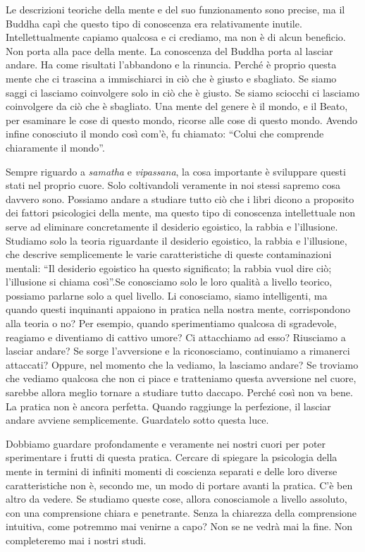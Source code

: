 Le descrizioni teoriche della mente e del suo funzionamento sono
precise, ma il Buddha capì che questo tipo di conoscenza era
relativamente inutile. Intellettualmente capiamo qualcosa e ci crediamo,
ma non è di alcun beneficio. Non porta alla pace della mente. La
conoscenza del Buddha porta al lasciar andare. Ha come risultati
l'abbandono e la rinuncia. Perché è proprio questa mente che ci trascina
a immischiarci in ciò che è giusto e sbagliato. Se siamo saggi ci
lasciamo coinvolgere solo in ciò che è giusto. Se siamo sciocchi ci
lasciamo coinvolgere da ciò che è sbagliato. Una mente del genere è il
mondo, e il Beato, per esaminare le cose di questo mondo, ricorse alle
cose di questo mondo. Avendo infine conosciuto il mondo così com'è, fu
chiamato: ``Colui che comprende chiaramente il mondo''.

Sempre riguardo a \emph{samatha} e \emph{vipassana}, la cosa importante
è sviluppare questi stati nel proprio cuore. Solo coltivandoli veramente
in noi stessi sapremo cosa davvero sono. Possiamo andare a studiare
tutto ciò che i libri dicono a proposito dei fattori psicologici della
mente, ma questo tipo di conoscenza intellettuale non serve ad eliminare
concretamente il desiderio egoistico, la rabbia e l'illusione. Studiamo
solo la teoria riguardante il desiderio egoistico, la rabbia e
l'illusione, che descrive semplicemente le varie caratteristiche di
queste contaminazioni mentali: ``Il desiderio egoistico ha questo
significato; la rabbia vuol dire ciò; l'illusione si chiama così''.Se
conosciamo solo le loro qualità a livello teorico, possiamo parlarne
solo a quel livello. Li conosciamo, siamo intelligenti, ma quando questi
inquinanti appaiono in pratica nella nostra mente, corrispondono alla
teoria o no? Per esempio, quando sperimentiamo qualcosa di sgradevole,
reagiamo e diventiamo di cattivo umore? Ci attacchiamo ad esso?
Riusciamo a lasciar andare? Se sorge l'avversione e la riconosciamo,
continuiamo a rimanerci attaccati? Oppure, nel momento che la vediamo,
la lasciamo andare? Se troviamo che vediamo qualcosa che non ci piace e
tratteniamo questa avversione nel cuore, sarebbe allora meglio tornare a
studiare tutto daccapo. Perché così non va bene. La pratica non è ancora
perfetta. Quando raggiunge la perfezione, il lasciar andare avviene
semplicemente. Guardatelo sotto questa luce.

Dobbiamo guardare profondamente e veramente nei nostri cuori per poter
sperimentare i frutti di questa pratica. Cercare di spiegare la
psicologia della mente in termini di infiniti momenti di coscienza
separati e delle loro diverse caratteristiche non è, secondo me, un modo
di portare avanti la pratica. C'è ben altro da vedere. Se studiamo
queste cose, allora conosciamole a livello assoluto, con una
comprensione chiara e penetrante. Senza la chiarezza della comprensione
intuitiva, come potremmo mai venirne a capo? Non se ne vedrà mai la
fine. Non completeremo mai i nostri studi.

